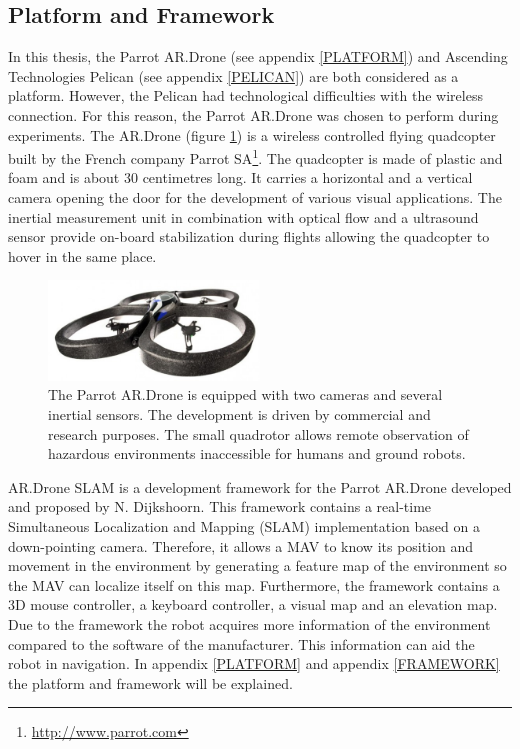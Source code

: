 \documentclass[a4paper]{article}
\begin{document}
\subsection{Platform and Framework}
In this thesis, the Parrot AR.Drone (see
appendix \ref{PLATFORM}) and Ascending Technologies Pelican (see appendix \ref{PELICAN}) are both considered as a platform. However, the Pelican had technological difficulties with the wireless connection. For this reason, the Parrot AR.Drone was chosen to perform during experiments. The AR.Drone (figure \ref{ardrone}) is a wireless controlled flying quadcopter built by the French company Parrot SA\footnote{\url{http://www.parrot.com}}. The quadcopter is made of plastic and foam and is about 30 centimetres long. It carries a horizontal and a vertical camera opening the door for the development of various visual applications. The inertial measurement unit in combination with optical flow and a ultrasound sensor provide on-board stabilization during flights allowing the quadcopter to hover in the same place. 

\begin{figure}[!ht]
	\centering
	\includegraphics[width=0.5\textwidth]{images/ardrone.jpg}
	\caption{The Parrot AR.Drone is equipped with two cameras and several inertial sensors. The development is driven by commercial and research purposes. The small quadrotor allows remote observation of hazardous environments inaccessible for humans and ground robots.}
	\label{ardrone}
\end{figure}

AR.Drone SLAM \cite{Dijkshoorn2012} is a development framework for the Parrot AR.Drone developed and proposed by N. Dijkshoorn. This framework contains a real-time Simultaneous Localization and Mapping (SLAM) implementation based on a down-pointing camera. Therefore, it allows a MAV to know its position and movement in the environment by generating a feature map of the environment so the MAV can localize itself on this map. Furthermore, the framework contains a 3D mouse controller, a keyboard controller, a visual map and an elevation map. Due to the framework the robot acquires more information of the environment compared to the software of the manufacturer. This information can aid the robot in navigation. In appendix \ref{PLATFORM} and appendix \ref{FRAMEWORK} the platform and framework will be explained.
\end{document}
